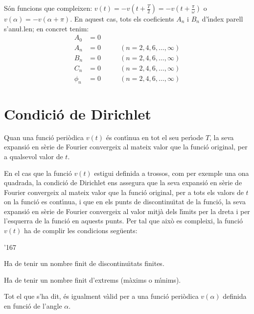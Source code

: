 S\'{o}n funcions que compleixen: $v(t) = -v(t+\frac{T}{2})=
-v(t+\frac{\pi}{\omega})$ o $v(\alpha) = -v(\alpha+\pi)$. En aquest
cas, tots els coeficients $A_n$ i $B_n$ d'\'{\i}ndex parell s'anu{\l.l}en;
en concret tenim:
\begin{subequations}
\begin{alignat}{2}
    A_0 &= 0       & \\[0.5ex]
    A_n &= 0       &\qquad (n = 2,4,6,\ldots,\infty)\\[0.5ex]
    B_n &= 0       &\qquad (n = 2,4,6,\ldots,\infty)\\[0.5ex]
    C_n &= 0       &\qquad (n = 2,4,6,\ldots,\infty)\\[0.5ex]
    \phi_n &= 0 &\qquad (n = 2,4,6,\ldots,\infty)
\end{alignat}
\end{subequations}

\section{Condici\'{o} de Dirichlet}

Quan una funci\'{o} peri\`{o}dica $v(t)$  \'{e}s cont\'{\i}nua en tot el seu per\'{\i}ode
$T$, la seva expansi\'{o} en s\`{e}rie de Fourier convergeix al mateix valor
que la funci\'{o} original, per a qualsevol valor de $t$.

En el cas que la funci\'{o} $v(t)$ estigui definida a trossos, com per
exemple una ona quadrada, la condici\'{o} de Dirichlet ens assegura que
la seva expansi\'{o} en s\`{e}rie de Fourier convergeix al mateix valor que
la funci\'{o} original, per a tots els valors de $t$ on la funci\'{o} es
cont\'{\i}nua, i que en els punts de discontinu\"{\i}tat de la funci\'{o}, la seva
expansi\'{o} en s\`{e}rie de Fourier convergeix al valor mitj\`{a} dels l\'{\i}mits
per la dreta i per l'esquerra de la funci\'{o} en aquests punts. Per tal
que aix\`{o} es compleixi, la funci\'{o} $v(t)$ ha de complir les condicions
seg\"{u}ents:
\begin{dinglist}{'167}
   \item Ha de tenir un nombre finit de discontinu\"{\i}tats
   finites.
   \item Ha de tenir un nombre finit d'extrems (m\`{a}xims o m\'{\i}nims).
\end{dinglist}

Tot el que s'ha dit, \'{e}s igualment v\`{a}lid per a una funci\'{o} peri\`{o}dica
$v(\alpha)$  definida en funci\'{o} de l'angle $\alpha$.

